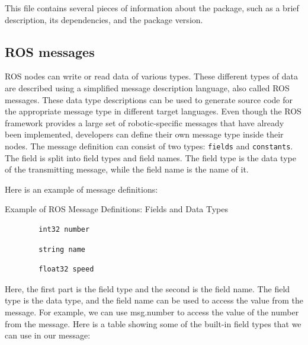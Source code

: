 \documentclass[../../main]{subfiles}
\begin{document}
    This file contains several pieces of information about the package, such as a brief
description, its dependencies, and the package version.

\subsection{ROS messages}
ROS nodes can write or read data of various types. These different types of data are
described using a simplified message description language, also called ROS messages.
These data type descriptions can be used to generate source code for the appropriate
message type in different target languages.
Even though the ROS framework provides a large set of robotic-specific messages that
have already been implemented, developers can define their own message type inside their
nodes.
The message definition can consist of two types: \texttt{fields} and \texttt{constants}. The field is
split into field types and field names. The field type is the data type of the transmitting
message, while the field name is the name of it.

Here is an example of message definitions:
\begin{codebox}[]{Example of ROS Message Definitions: Fields and Data Types}
    \begin{verbatim}
        int32 number
    \end{verbatim}
    \begin{verbatim}
        string name
    \end{verbatim}
    \begin{verbatim}
        float32 speed
    \end{verbatim}
    \end{codebox}
Here, the first part is the field type and the second is the field name. The field type is
the data type, and the field name can be used to access the value from the message. For
example, we can use msg.number to access the value of the number from the message.
\newpage
Here is a table showing some of the built-in field types that we can use in our message:
\end{document}
